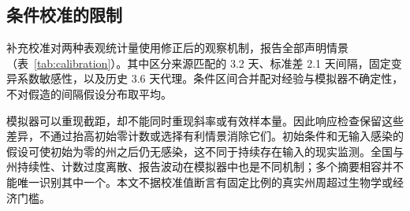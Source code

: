 \subsection{条件校准的限制}
\label{sec:res-sim}

补充校准对两种表观统计量使用修正后的观察机制，报告全部声明情景（表~\ref{tab:calibration}）。其中区分来源匹配的 3.2 天、标准差 2.1 天间隔，固定变异系数敏感性，以及历史 3.6 天代理。条件区间合并配对经验与模拟器不确定性，不对假造的间隔假设分布取平均。

模拟器可以重现截距，却不能同时重现斜率或有效样本量。因此响应检查保留这些差异，不通过抬高初始零计数或选择有利情景消除它们。初始条件和无输入感染的假设可使初始为零的州之后仍无感染，这不同于持续存在输入的现实监测。全国与州持续性、计数过度离散、报告波动在模拟器中也是不同机制；多个摘要相容并不能唯一识别其中一个。本文不据校准值断言有固定比例的真实州周超过生物学或经济门槛。
